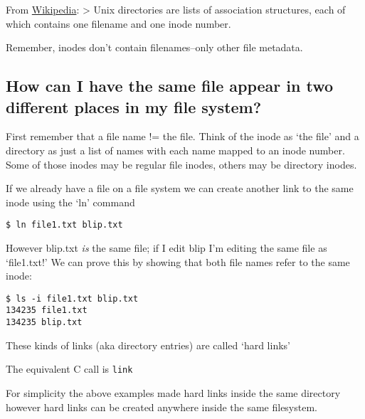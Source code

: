 From \href{http://en.wikipedia.org/wiki/Inode}{Wikipedia}:
\textgreater{} Unix directories are lists of association structures,
each of which contains one filename and one inode number.

Remember, inodes don't contain filenames--only other file metadata.

\subsection{How can I have the same file appear in two different places
in my file
system?}\label{how-can-i-have-the-same-file-appear-in-two-different-places-in-my-file-system}

First remember that a file name != the file. Think of the inode as `the
file' and a directory as just a list of names with each name mapped to
an inode number. Some of those inodes may be regular file inodes, others
may be directory inodes.

If we already have a file on a file system we can create another link to
the same inode using the `ln' command

\begin{verbatim}
$ ln file1.txt blip.txt
\end{verbatim}

However blip.txt \emph{is} the same file; if I edit blip I'm editing the
same file as `file1.txt!' We can prove this by showing that both file
names refer to the same inode:

\begin{verbatim}
$ ls -i file1.txt blip.txt
134235 file1.txt
134235 blip.txt
\end{verbatim}

These kinds of links (aka directory entries) are called `hard links'

The equivalent C call is \texttt{link}

\begin{Shaded}
\begin{Highlighting}[]
    

\NormalTok{, }\NormalTok{);}
\end{Highlighting}
\end{Shaded}

For simplicity the above examples made hard links inside the same
directory however hard links can be created anywhere inside the same
filesystem.

